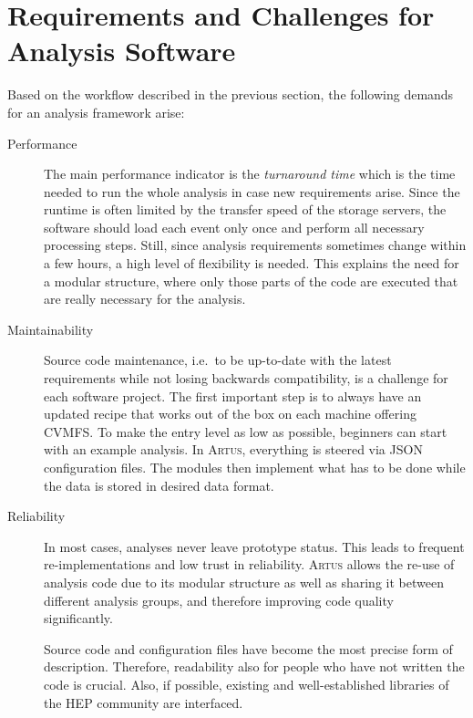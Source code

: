 \documentclass[3p]{elsarticle}
\newcommand{\software}[1]{\textsc{#1}\xspace}
\newcommand{\artus}{\software{Artus}}
\begin{document}
\section{Requirements and Challenges for Analysis Software}
\label{section_artus_challenges}
Based on the workflow described in the previous section, the following demands for an analysis framework arise:

\begin{description}
\item[Performance]
The main performance indicator is the \emph{turnaround time} which is the time needed to run the whole analysis in case new requirements arise.
Since the runtime is often limited by the transfer speed of the storage servers, the software should load each event only once and perform all necessary processing steps.
Still, since analysis requirements sometimes change within a few hours, a high level of flexibility is needed.
This explains the need for a modular structure, where only those parts of the code are executed that are really necessary for the analysis.

\item[Maintainability]
Source code maintenance, i.e.\ to be up-to-date with the latest requirements while not losing backwards compatibility, is a challenge for each software project.
The first important step is to always have an updated recipe that works out of the box on each machine offering CVMFS.
To make the entry level as low as possible, beginners can start with an example analysis.
In \artus, everything is steered via JSON configuration files.
The modules then implement what has to be done while the data is stored in desired data format.


\item[Reliability]
In most cases, analyses never leave prototype status.
This leads to frequent re-imple\-men\-ta\-tions and low trust in reliability.
\artus allows the re-use of analysis code due to its modular structure as well as sharing it between different analysis groups, and therefore improving code quality significantly.

Source code and configuration files have become the most precise form of description.
Therefore, readability also for people who have not written the code is crucial.
Also, if possible, existing and well-established libraries of the HEP community are interfaced.
\end{description}
\end{document}
